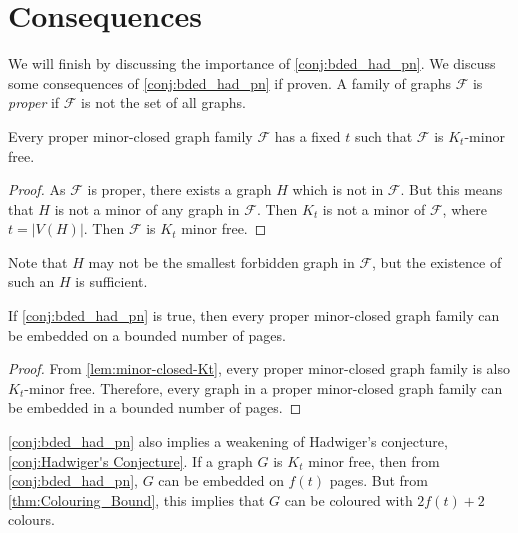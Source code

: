 \section{Consequences}
We will finish by discussing the importance of \cref{conj:bded_had_pn}. We discuss some consequences of \cref{conj:bded_had_pn} if proven. 
A family of graphs $\mathcal{F}$ is \textit{proper} if $\mathcal{F}$ is not the set of all graphs. 

\begin{lemma}\label{lem:minor-closed-Kt}
    Every proper minor-closed graph family $\mathcal{F}$ has a fixed $t$ such that $\mathcal{F}$ is $K_t$-minor free. 
\end{lemma}

\begin{proof}
    As $\mathcal{F}$ is proper, there exists a graph $H$ which is not in $\mathcal{F}$. But this means that $H$ is not a minor of any graph in $\mathcal{F}$. Then $K_t$ is not a minor of $\mathcal{F}$, where $t = |V(H)|$. Then $\mathcal{F}$ is $K_t$ minor free. 
\end{proof}
Note that $H$ may not be the smallest forbidden graph in $\mathcal{F}$, but the existence of such an $H$ is sufficient. 
\begin{lemma}\label{lem:Minor-Closed_Pagenumber}
    If \cref{conj:bded_had_pn} is true, then every proper minor-closed graph family can be embedded on a bounded number of pages.
\end{lemma}
\begin{proof}
    From \cref{lem:minor-closed-Kt}, every proper minor-closed graph family is also $K_t$-minor free. Therefore, every graph in a proper minor-closed graph family can be embedded in a bounded number of pages.
\end{proof}

\cref{conj:bded_had_pn} also implies a weakening of Hadwiger's conjecture, \cref{conj:Hadwiger's Conjecture}.  If a graph $G$ is $K_t$ minor free, then from \cref{conj:bded_had_pn}, $G$ can be embedded on $f(t)$ pages. But from \cref{thm:Colouring_Bound}, this implies that $G$ can be coloured with $2f(t) + 2$ colours. 